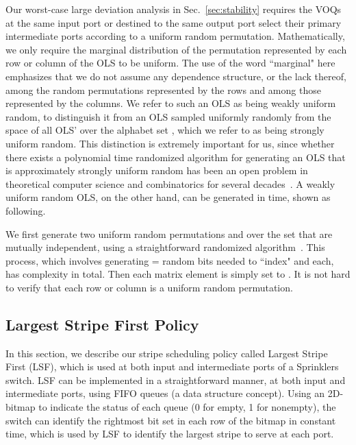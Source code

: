 Our worst-case large deviation analysis in Sec.~\ref{sec:stability} requires the  VOQs at the same input port or 
destined to the same output port
select their primary intermediate ports according to a uniform random permutation.
Mathematically, we only require the marginal distribution of the permutation represented by each row or column 
of the 
OLS
 to be uniform.  
The use of the word ``marginal" here emphasizes that
we do not assume any dependence structure, or the lack thereof, among the  random permutations 
represented by the  rows and among those represented by the  columns.  We refer to such an OLS as being weakly uniform random, to 
distinguish it from an OLS sampled uniformly randomly from the space of all
OLS' over the alphabet set , which we refer to as being strongly uniform random.  
This distinction is extremely important for us, since  
whether there exists a polynomial time randomized algorithm for generating an OLS that is approximately strongly
uniform random has been an open problem in theoretical computer science and combinatorics 
for several decades~\cite{drizen2012generating,jacobson1996generating}.
A weakly uniform random OLS,
on the other hand, can be generated in  time, shown as following.

We first generate two 
uniform random permutations 
and  over the set  that are mutually independent,
using a straightforward randomized algorithm~\cite{durstenfeld1964algorithm}.  
This process, which involves generating
 =  random bits needed to ``index" 
 and  each,  has  complexity in total.  Then each matrix 
element  is simply set to .   It is not hard 
to verify that each row or column is a uniform random permutation.







\subsection{Largest Stripe First Policy}
\label{sec: lsf scheduling}







In this section, we describe our stripe scheduling policy called Largest Stripe First (LSF), which is used at both
input and intermediate ports of a Sprinklers switch.  LSF can be implemented in a straightforward
manner, at both input and intermediate ports, using  FIFO queues (a data structure concept).
Using an  2D-bitmap to indicate the status of each queue (0 for empty, 1 for nonempty),
the switch can identify the rightmost bit set in each row of the bitmap in constant time,
which is used by LSF to identify the largest stripe to serve at each port.



